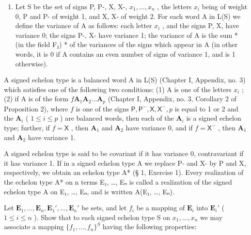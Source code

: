 \exercisegroup

\begin{enumerate}
\def\labelenumi{\arabic{enumi}.}
\tightlist
\item
  Let S be the set of signs P, P-, X, X-, \(x_1, \ldots, x_n\) , the letters \(x_i\) being of weight 0, P and P- of weight 1, and X, X- of weight 2. For each word A in L(S) we define the variance of A as follows: each letter \(x_i\) , and the signs P, X, have variance 0; the signs P-, X- have variance 1; the variance of A is the sum * (in the field F₂) * of the variances of the signs which appear in A (in other words, it is 0 if A contains an even number of signs of variance 1, and is 1 otherwise).
\end{enumerate}

A signed echelon type is a balanced word A in L(S) (Chapter I, Appendix, no. 3) which satisfies one of the following two conditions: (1) A is one of the letters \(x_i\) ; (2) if A is of the form \(f\mathbf{A}_1\mathbf{A}_2 \ldots \mathbf{A}_p\) (Chapter I, Appendix, no. 3, Corollary 2 of Proposition 2), where \(f\) is one of the signs \(\mathsf{P}, \mathsf{P}^{-}, \mathsf{X}, \mathsf{X}^{-}, p\) is equal to 1 or 2 and the \(\mathbf{A}_i\) ( \(1 \leqslant i \leqslant p\) ) are balanced words, then each of the \(\mathbf{A}_i\) is a signed echelon type; further, if \(f = \mathsf{X}\) , then \(\mathbf{A}_1\) and \(\mathbf{A}_2\) have variance 0, and if \(f = \mathsf{X}^{-}\) , then \(\mathbf{A}_1\) and \(\mathbf{A}_2\) have variance 1.

A signed echelon type is said to be covariant if it has variance 0, contravariant if it has variance 1. If in a signed echelon type A we replace P- and X- by P and X, respectively, we obtain an echelon type A* (§ 1, Exercise 1). Every realization of the echelon type A* on n terms E₁, \ldots, Eₙ is called a realization of the signed echelon type A on E₁, \ldots, Eₙ, and is written A(E₁, \ldots, Eₙ).

Let \(\mathbf{E}_1, \ldots, \mathbf{E}_n, \mathbf{E}_1', \ldots, \mathbf{E}_n'\) be sets, and let \(f_i\) be a mapping of \(\mathbf{E}_i\) into \(\mathbf{E}_i'\) ( \(1 \leqslant i \leqslant n\) ). Show that to each signed echelon type S on \(x_1, \ldots, x_n\) we may associate a mapping \(\{f_1, \ldots, f_n\}^{S}\) having the following properties:

